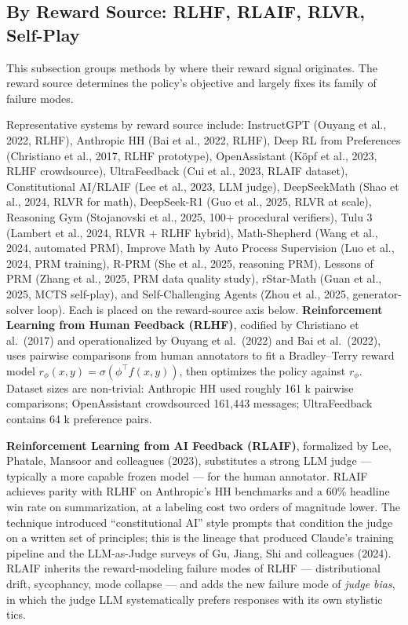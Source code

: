 \documentclass{article}
\begin{document}
\subsection{By Reward Source: RLHF, RLAIF, RLVR, Self-Play}\label{by-reward-source-rlhf-rlaif-rlvr-self-play}

This subsection groups methods by where their reward signal originates. The reward source determines the policy's objective and largely fixes its family of failure modes.

Representative systems by reward source include: InstructGPT (Ouyang et al., 2022, RLHF), Anthropic HH (Bai et al., 2022, RLHF), Deep RL from Preferences (Christiano et al., 2017, RLHF prototype), OpenAssistant (Köpf et al., 2023, RLHF crowdsource), UltraFeedback (Cui et al., 2023, RLAIF dataset), Constitutional AI/RLAIF (Lee et al., 2023, LLM judge), DeepSeekMath (Shao et al., 2024, RLVR for math), DeepSeek-R1 (Guo et al., 2025, RLVR at scale), Reasoning Gym (Stojanovski et al., 2025, 100+ procedural verifiers), Tulu 3 (Lambert et al., 2024, RLVR + RLHF hybrid), Math-Shepherd (Wang et al., 2024, automated PRM), Improve Math by Auto Process Supervision (Luo et al., 2024, PRM training), R-PRM (She et al., 2025, reasoning PRM), Lessons of PRM (Zhang et al., 2025, PRM data quality study), rStar-Math (Guan et al., 2025, MCTS self-play), and Self-Challenging Agents (Zhou et al., 2025, generator-solver loop). Each is placed on the reward-source axis below. \textbf{Reinforcement Learning from Human Feedback (RLHF)}, codified by Christiano et al.~(2017) and operationalized by Ouyang et al.~(2022) and Bai et al.~(2022), uses pairwise comparisons from human annotators to fit a Bradley--Terry reward model \(r_\phi(x, y) = \sigma(\phi^\top f(x,y))\), then optimizes the policy against \(r_\phi\). Dataset sizes are non-trivial: Anthropic HH used roughly 161 k pairwise comparisons; OpenAssistant \citep{kpf20232023} crowdsourced 161,443 messages; UltraFeedback contains 64 k preference pairs.

\textbf{Reinforcement Learning from AI Feedback (RLAIF)}, formalized by Lee, Phatale, Mansoor and colleagues (2023), substitutes a strong LLM judge --- typically a more capable frozen model --- for the human annotator. RLAIF achieves parity with RLHF on Anthropic's HH benchmarks and a 60\% headline win rate on summarization, at a labeling cost two orders of magnitude lower. The technique introduced ``constitutional AI'' style prompts that condition the judge on a written set of principles; this is the lineage that produced Claude's training pipeline and the LLM-as-Judge surveys of Gu, Jiang, Shi and colleagues (2024). RLAIF inherits the reward-modeling failure modes of RLHF --- distributional drift, sycophancy, mode collapse --- and adds the new failure mode of \emph{judge bias}, in which the judge LLM systematically prefers responses with its own stylistic tics.
\end{document}
